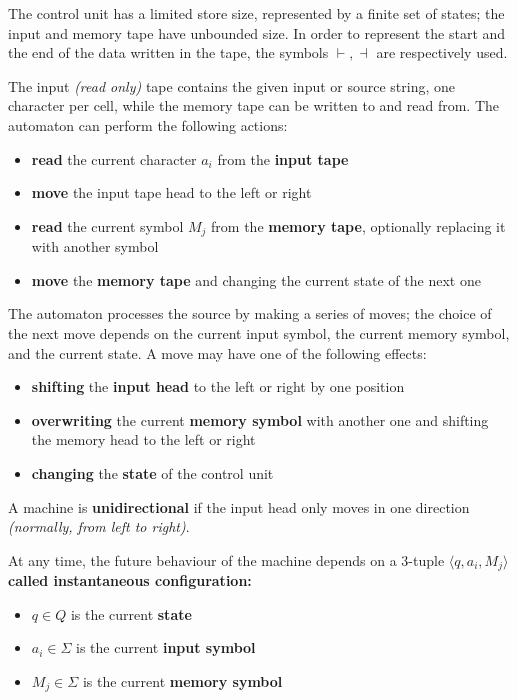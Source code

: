 \documentclass[english]{article}
\begin{document}
The control unit has a limited store size, represented by a finite set of states;
the input and memory tape have unbounded size.
In order to represent the start and the end of the data written in the tape, the symbols \(\vdash, \dashv\) are respectively used.

The input \textit{(read only)} tape contains the given input or source string, one character per cell, while the memory tape can be written to and read from.
The automaton can perform the following actions:

\begin{itemize}
  \item \textbf{read} the current character \(a_i\) from the \textbf{input tape}
  \item \textbf{move} the input tape head to the left or right
  \item \textbf{read} the current symbol \(M_j\) from the \textbf{memory tape}, optionally replacing it with another symbol
  \item \textbf{move} the \textbf{memory tape} and changing the current state of the next one
\end{itemize}

The automaton processes the source by making a series of moves;
the choice of the next move depends on the current input symbol, the current memory symbol, and the current state.
A move may have one of the following effects:

\begin{itemize}
  \item \textbf{shifting} the \textbf{input head} to the left or right by one position
  \item \textbf{overwriting} the current \textbf{memory symbol} with another one and shifting the memory head to the left or right
  \item \textbf{changing} the \textbf{state} of the control unit
\end{itemize}

A machine is \textbf{unidirectional} if the input head only moves in one direction \textit{(normally, from left to right)}.

\bigskip
At any time, the future behaviour of the machine depends on a \(3\)-tuple \(\langle q, a_i, M_j \rangle\) \textbf{called instantaneous configuration:}

\begin{itemize}
  \item \(q \in Q\) is the current \textbf{state}
  \item  \(a_i \in \Sigma\) is the current \textbf{input symbol}
  \item \(M_j \in \Sigma\) is the current \textbf{memory symbol}
\end{itemize}
\end{document}
